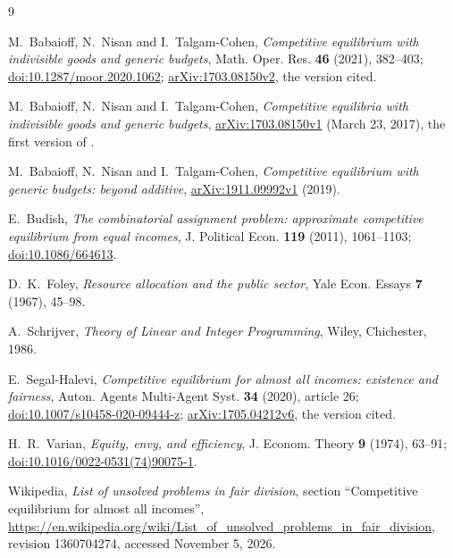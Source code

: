 \documentclass[11pt]{article}
\theoremstyle{definition}
\theoremstyle{remark}
\begin{document}
\begin{thebibliography}{9}

M.~Babaioff, N.~Nisan and I.~Talgam-Cohen, \emph{Competitive equilibrium
with indivisible goods and generic budgets}, Math. Oper. Res. \textbf{46}
(2021), 382--403;
\href{https://doi.org/10.1287/moor.2020.1062}{doi:10.1287/moor.2020.1062};
\href{https://arxiv.org/abs/1703.08150v2}{arXiv:1703.08150v2}, the version
cited.

M.~Babaioff, N.~Nisan and I.~Talgam-Cohen, \emph{Competitive equilibria
with indivisible goods and generic budgets},
\href{https://arxiv.org/abs/1703.08150v1}{arXiv:1703.08150v1} (March 23,
2017), the first version of \cite{BNT}.

M.~Babaioff, N.~Nisan and I.~Talgam-Cohen, \emph{Competitive equilibrium
with generic budgets: beyond additive},
\href{https://arxiv.org/abs/1911.09992v1}{arXiv:1911.09992v1} (2019).

E.~Budish, \emph{The combinatorial assignment problem: approximate
competitive equilibrium from equal incomes}, J. Political Econ.
\textbf{119} (2011), 1061--1103;
\href{https://doi.org/10.1086/664613}{doi:10.1086/664613}.

D.~K.~Foley, \emph{Resource allocation and the public sector}, Yale
Econ. Essays \textbf{7} (1967), 45--98.

A.~Schrijver, \emph{Theory of Linear and Integer Programming}, Wiley,
Chichester, 1986.

E.~Segal-Halevi, \emph{Competitive equilibrium for almost all incomes:
existence and fairness}, Auton. Agents Multi-Agent Syst. \textbf{34}
(2020), article 26;
\href{https://doi.org/10.1007/s10458-020-09444-z}{doi:10.1007/s10458-020-09444-z};
\href{https://arxiv.org/abs/1705.04212v6}{arXiv:1705.04212v6}, the version
cited.

H.~R.~Varian, \emph{Equity, envy, and efficiency}, J. Econom. Theory
\textbf{9} (1974), 63--91;
\href{https://doi.org/10.1016/0022-0531(74)90075-1}{doi:10.1016/0022-0531(74)90075-1}.

Wikipedia, \emph{List of unsolved problems in fair division}, section
``Competitive equilibrium for almost all incomes'',
\url{https://en.wikipedia.org/wiki/List_of_unsolved_problems_in_fair_division},
revision 1360704274, accessed November 5, 2026.

\end{thebibliography}
\end{document}
